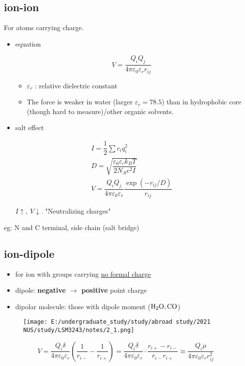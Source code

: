 \hypertarget{ion-ion}{%
	\subsection{ion-ion}\label{ion-ion}}

For atoms carrying charge.

\begin{itemize}
	\item
	equation
	
	\[V=\dfrac{Q_iQ_j}{4\pi\varepsilon_0\varepsilon_rr_{ij}}\]
	
	\begin{itemize}
		\item
		\(\varepsilon_r\) : relative dielectric constant
		\item
		The force is weaker in water (larger \(\varepsilon_r=78.5\)) than in
		hydrophobic core (though hard to measure)/other organic solvents.
	\end{itemize}
	\item
	salt effect
	
	\begin{gather*}
	I=\dfrac{1}{2}\sum c_iq_i^2\\
	D=\sqrt{\dfrac{\varepsilon_0\varepsilon_rk_BT}{2N_Ae^2I}}\\
	V=\dfrac{Q_iQ_j}{4\pi\varepsilon_0\varepsilon_r}\dfrac{\exp(-r_{ij}/D)}{r_{ij}}
	\end{gather*}
	
	\(I \uparrow,\ V\downarrow\). "Neutralizing charges"
\end{itemize}

eg: N and C terminal, side chain (salt bridge)

\hypertarget{ion-dipole}{%
	\subsection{ion-dipole}\label{ion-dipole}}

\begin{itemize}
	\item
	for ion with groups carrying \underline{no formal charge}
	\item
	dipole: \textbf{negative \(\rightarrow\) positive} point charge
	\item
	dipolar molecule: those with dipole moment (\(\ce{H2O, CO}\))
\end{itemize}

\begin{figure}
	\centering
	\texttt{[image: E:/undergraduate\_study/study/abroad study/2021 NUS/study/LSM3243/notes/2\_1.png]}
\end{figure}
\[V=\dfrac{Q_i\delta}{4\pi\varepsilon_0\varepsilon_r}(\dfrac{1}{r_{i-}}-\dfrac{1}{r_{i+}})=\dfrac{Q_i\delta}{4\pi\varepsilon_0\varepsilon_r}\cdot\dfrac{r_{i+}-r_{i-}}{r_{i-}r_{i+}}\approx\dfrac{Q_i\mu}{4\pi\varepsilon_0\varepsilon_rr_{ij}^2}\]

